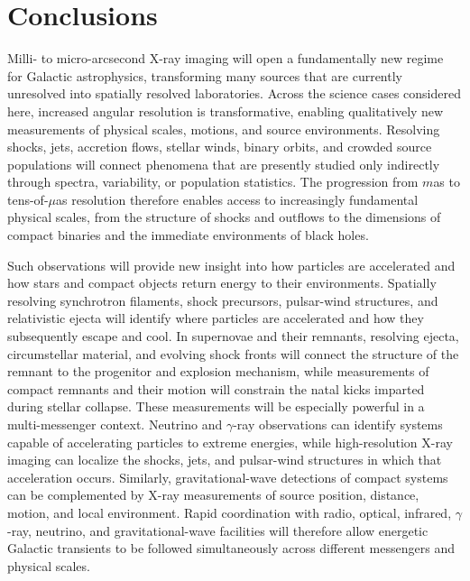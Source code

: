 \documentclass{article}
\begin{document}
\section{Conclusions}
Milli- to micro-arcsecond X-ray imaging will open a fundamentally new regime for Galactic astrophysics, transforming many sources that are currently unresolved into spatially resolved laboratories. Across the science cases considered here, increased angular resolution is transformative, enabling qualitatively new measurements of physical scales, motions, and source environments. Resolving shocks, jets, accretion flows, stellar winds, binary orbits, and crowded source populations will connect phenomena that are presently studied only indirectly through spectra, variability, or population statistics. The progression from $m$as to tens-of-$\mu$as resolution therefore enables access to increasingly fundamental physical scales, from the structure of shocks and outflows to the dimensions of compact binaries and the immediate environments of black holes.

Such observations will provide new insight into how particles are accelerated and how stars and compact objects return energy to their environments. Spatially resolving synchrotron filaments, shock precursors, pulsar-wind structures, and relativistic ejecta will identify where particles are accelerated and how they subsequently escape and cool. In supernovae and their remnants, resolving ejecta, circumstellar material, and evolving shock fronts will connect the structure of the remnant to the progenitor and explosion mechanism, while measurements of compact remnants and their motion will constrain the natal kicks imparted during stellar collapse. These measurements will be especially powerful in a multi-messenger context. Neutrino and $\gamma$-ray observations can identify systems capable of accelerating particles to extreme energies, while high-resolution X-ray imaging can localize the shocks, jets, and pulsar-wind structures in which that acceleration occurs. Similarly, gravitational-wave detections of compact systems can be complemented by X-ray measurements of source position, distance, motion, and local environment. Rapid coordination with radio, optical, infrared, $\gamma$-ray, neutrino, and gravitational-wave facilities will therefore allow energetic Galactic transients to be followed simultaneously across different messengers and physical scales.
\end{document}
